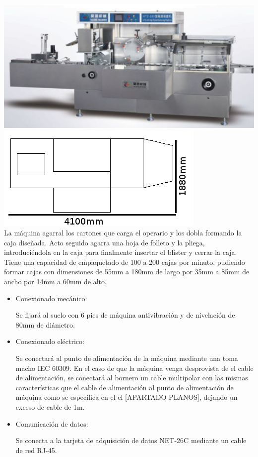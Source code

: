 	\includegraphics[scale=0.4]{Datasheets/7Foto.png}\hfill
	\includegraphics[scale=0.5]{Datasheets/Miniaturas/empaquetar.png}\hfill\\

	La máquina agarral los cartones que carga el operario y los dobla formando la caja diseñada. Acto seguido agarra una hoja de folleto y la pliega, introduciéndola en la caja para finalmente insertar el blister y cerrar la caja.\\

	Tiene una capacidad de empaquetado de 100 a 200 cajas por minuto, pudiendo formar cajas con dimensiones de 55mm a 180mm de largo por 35mm a 85mm de ancho por 14mm a 60mm de alto.


		\begin{itemize}
				\item{Conexionado mecánico:}
				
				Se fijará al suelo con 6 pies de máquina antivibración y de nivelación de 80mm de diámetro.

				\item{Conexionado eléctrico:}

				Se conectará al punto de alimentación de la máquina mediante una  toma macho IEC 60309. En el caso de que la máquina venga desprovista de el cable de alimentación, se conectará al bornero un cable multipolar con las mismas características que el cable de alimentación al punto de alimentación de máquina como se especifica en el el [APARTADO PLANOS], dejando un exceso de cable de 1m. \
				
				\item{Comunicación de datos:}

				Se conecta a la tarjeta de adquisición de datos NET-26C mediante un cable de red RJ-45.
		\end{itemize}

